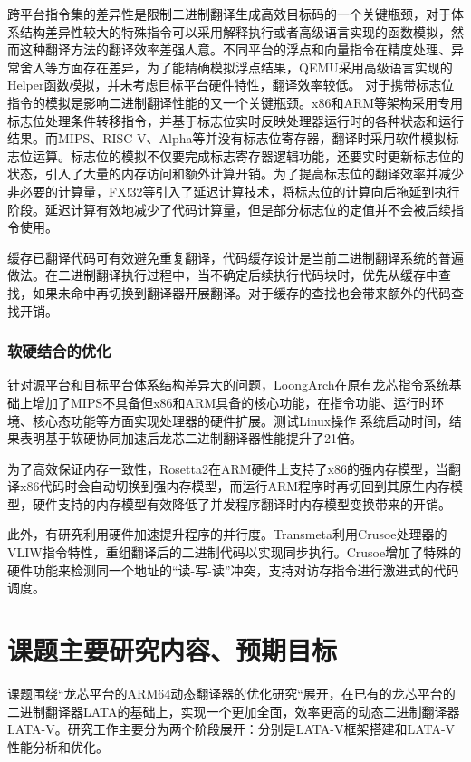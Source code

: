 跨平台指令集的差异性是限制二进制翻译生成高效目标码的一个关键瓶颈，对于体系结构差异性较大的特殊指令可以采用解释执行或者高级语言实现的函数模拟，然而这种翻译方法的翻译效率差强人意。不同平台的浮点和向量指令在精度处理、异常舍入等方面存在差异，为了能精确模拟浮点结果，QEMU采用高级语言实现的Helper函数模拟，并未考虑目标平台硬件特性，翻译效率较低。
对于携带标志位指令的模拟是影响二进制翻译性能的又一个关键瓶颈。x86和ARM等架构采用专用标志位处理条件转移指令，并基于标志位实时反映处理器运行时的各种状态和运行结果。而MIPS、RISC-V、Alpha等并没有标志位寄存器，翻译时采用软件模拟标志位运算。标志位的模拟不仅要完成标志寄存器逻辑功能，还要实时更新标志位的状态，引入了大量的内存访问和额外计算开销。为了提高标志位的翻译效率并减少非必要的计算量，FX!32等引入了延迟计算技术，将标志位的计算向后拖延到执行阶段。延迟计算有效地减少了代码计算量，但是部分标志位的定值并不会被后续指令使用。

缓存已翻译代码可有效避免重复翻译，代码缓存设计是当前二进制翻译系统的普遍做法。在二进制翻译执行过程中，当不确定后续执行代码块时，优先从缓存中查找，如果未命中再切换到翻译器开展翻译。对于缓存的查找也会带来额外的代码查找开销。

\subsubsection{软硬结合的优化}
针对源平台和目标平台体系结构差异大的问题，LoongArch在原有龙芯指令系统基础上增加了MIPS不具备但x86和ARM具备的核心功能，在指令功能、运行时环境、核心态功能等方面实现处理器的硬件扩展。测试Linux操作 系统启动时间，结果表明基于软硬协同加速后龙芯二进制翻译器性能提升了21倍。

为了高效保证内存一致性，Rosetta2在ARM硬件上支持了x86的强内存模型，当翻译x86代码时会自动切换到强内存模型，而运行ARM程序时再切回到其原生内存模型，硬件支持的内存模型有效降低了并发程序翻译时内存模型变换带来的开销。

此外，有研究利用硬件加速提升程序的并行度。Transmeta利用Crusoe处理器的VLIW指令特性，重组翻译后的二进制代码以实现同步执行。Crusoe增加了特殊的硬件功能来检测同一个地址的“读-写-读”冲突，支持对访存指令进行激进式的代码调度。

\section{课题主要研究内容、预期目标}
课题围绕“龙芯平台的ARM64动态翻译器的优化研究“展开，在已有的龙芯平台的二进制翻译器LATA的基础上，实现一个更加全面，效率更高的动态二进制翻译器LATA-V。研究工作主要分为两个阶段展开：分别是LATA-V框架搭建和LATA-V性能分析和优化。

